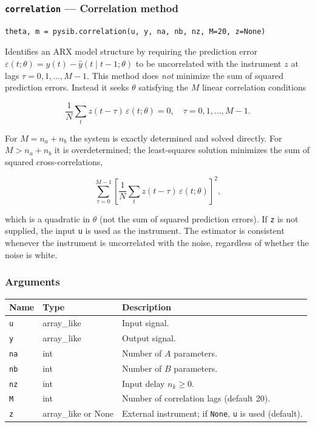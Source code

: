 \documentclass[../main]{subfiles}
\begin{document}
\newpage

\subsubsection{\texttt{correlation} --- Correlation method}

\begin{lstlisting}
theta, m = pysib.correlation(u, y, na, nb, nz, M=20, z=None)
\end{lstlisting}

Identifies an ARX model structure by requiring the prediction error
$\varepsilon(t;\theta) = y(t) - \hat{y}(t \mid t-1;\theta)$
to be uncorrelated with the instrument $z$ at lags
$\tau = 0, 1, \ldots, M-1$.
This method does \emph{not} minimize the sum of squared prediction
errors.  Instead it seeks $\theta$ satisfying the $M$ linear
correlation conditions

\[
  \frac{1}{N}\sum_t z(t-\tau)\,\varepsilon(t;\theta) = 0,
  \quad \tau = 0,1,\ldots,M-1.
\]

For $M = n_a + n_b$ the system is exactly determined and solved
directly.  For $M > n_a + n_b$ it is overdetermined; the
least-squares solution minimizes the sum of squared cross-correlations,

\[
  \sum_{\tau=0}^{M-1}
  \left[\frac{1}{N}\sum_t z(t-\tau)\,\varepsilon(t;\theta)\right]^2,
\]

which is a quadratic in $\theta$ (not the sum of squared prediction
errors).
If \texttt{z} is not supplied, the input \texttt{u} is used as the
instrument.  The estimator is consistent whenever the instrument is
uncorrelated with the noise, regardless of whether the noise is white.

\subsubsection*{Arguments}
\begin{center}
\begin{tabular}{lll}
  \toprule
  Name & Type & Description \\
  \midrule
  \texttt{u}  & array\_like & Input signal. \\
  \texttt{y}  & array\_like & Output signal. \\
  \texttt{na} & int & Number of $A$ parameters. \\
  \texttt{nb} & int & Number of $B$ parameters. \\
  \texttt{nz} & int & Input delay $n_k \geq 0$. \\
  \texttt{M}  & int & Number of correlation lags (default 20). \\
  \texttt{z}  & array\_like or None & External instrument; if \texttt{None},
                                      \texttt{u} is used (default). \\
  \bottomrule
\end{tabular}
\end{center}
\end{document}
